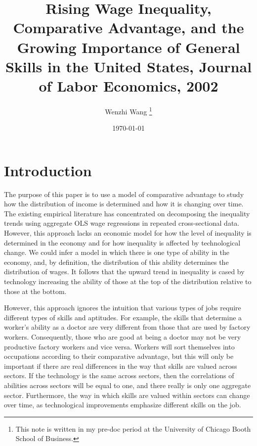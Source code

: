 \documentclass[12pt]{article}
\newcommand{\highlightO}[1]{{\emph{\color{MyOrange}{#1}}}}
\theoremstyle{definition}
\begin{document}
 


\title{\bf Rising Wage Inequality, Comparative Advantage, and the Growing Importance of General Skills in the United States, Journal of Labor Economics, 2002} 
\author{Wenzhi Wang \thanks{This note is written in my pre-doc period at the University of Chicago Booth School of Business.} } 
\date{\today} 
\maketitle 

\citet{gouldRisingWageInequality2002a}

\section{Introduction}

The purpose of this paper is to use a model of comparative advantage to study how the distribution of income is determined and how it is changing over time. The existing empirical literature has concentrated on decomposing the inequality trends using aggregate OLS wage regressions in repeated cross-sectional data. However, this approach lacks an economic model for how the level of inequality is determined in the economy and for how inequality is affected by technological change. We could infer a model in which there is one type of ability in the economy, and, by definition, the distribution of this ability determines the distribution of wages. It follows that the upward trend in inequality is cased by technology increasing the ability of those at the top of the distribution relative to those at the bottom. 

However, this approach ignores the intuition that various types of jobs require different types of skills and aptitudes. For example, the skills that determine a worker's ability as a doctor are very different from those that are used by factory workers. Consequently, those who are good at being a doctor may not be very productive factory workers and vice versa. Workers will sort themselves into occupations according to their comparative advantage, but this will only be important if there are real differences in the way that skills are valued across sectors. \highlightO{The role of technology in this framework is to determine whether the types of attributes valued highly in one sector are valued similarly in the other sectors.} If the technology is the same across sectors, then the correlations of abilities across sectors will be equal to one, and there really is only one aggregate sector. Furthermore, the way in which skills are valued within sectors can change over time, as technological improvements emphasize different skills on the job. 
\end{document}
